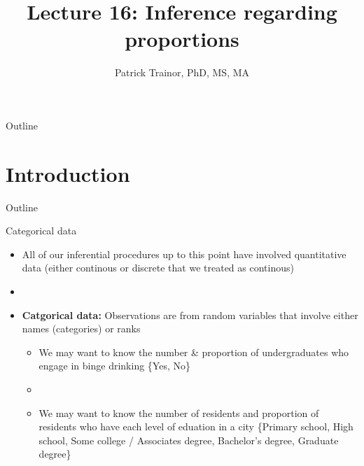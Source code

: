 \documentclass[xcolor=dvipsnames]{beamer}
\title[Lecture 16]{Lecture 16: Inference regarding proportions}
\author[Patrick Trainor]{Patrick Trainor, PhD, MS, MA}
\institute[NMSU]{New Mexico State University}
\date{}
\begin{document}
	
\begin{frame}
	\maketitle
\end{frame}

\begin{frame}{Outline}
	\tableofcontents[hideallsubsections]
\end{frame}

\section{Introduction}

\begin{frame}{Outline}
	\tableofcontents[currentsection,subsectionstyle=show/shaded/hide]
\end{frame}

\begin{frame}{Categorical data}
	\begin{itemize}
		\item All of our inferential procedures up to this point have involved quantitative data (either continous or discrete that we treated as continous) \pause
		\item[]
		\item \textbf{Catgorical data:} Observations are from random variables that involve either names (categories) or ranks \pause
		\begin{itemize}
			\item We may want to know the number \& proportion of undergraduates who engage in binge drinking \{Yes, No\} \pause
			\item[]
			\item We may want to know the number of residents and proportion of residents who have each level of eduation in a city \{Primary school, High school, Some college / Associates degree, Bachelor's degree, Graduate degree\}
		\end{itemize}
	\end{itemize}
\end{frame}
\end{document}
